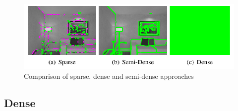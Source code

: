 \documentclass[11pt,a4paper,titlepage,oneside]{report}
\begin{document}
\begin{figure}[H]
  \begin{center}
    \includegraphics[width=1.0\textwidth]{img/sparse_dense.png}
  \end{center}
  \caption{Comparison of sparse, dense and semi-dense approaches \cite{svo}}\label{fig:sparse_dense}
\end{figure}

\subsection{Dense}
\end{document}
